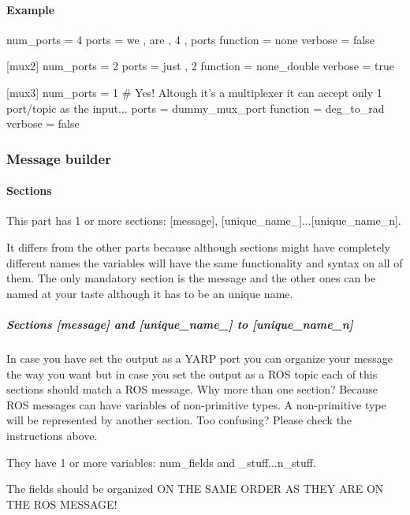 \paragraph*{Example}

\begin{DoxyVerb}[mux1]
num_ports = 4
ports = we , are , 4 , ports
function = none
verbose = false

[mux2]
num_ports = 2
ports = just , 2
function = none_double
verbose = true

[mux3]
num_ports = 1
# Yes! Altough it's a multiplexer it can accept only 1 port/topic as the input...
ports = dummy_mux_port
function = deg_to_rad
verbose = false
\end{DoxyVerb}


\subsubsection*{Message builder}

\paragraph*{Sections}

This part has 1 or more sections\-: {\ttfamily \mbox{[}message\mbox{]}}, {\ttfamily \mbox{[}unique\-\_\-name\-\_\mbox{]}...\mbox{[}unique\-\_\-name\-\_\-n\mbox{]}}.

It differs from the other parts because although sections might have completely different names the variables will have the same functionality and syntax on all of them. The only mandatory section is the {\ttfamily message} and the other ones can be named at your taste although it has to be an unique name.

\subparagraph*{Sections \mbox{[}message\mbox{]} and \mbox{[}unique\-\_\-name\-\_\mbox{]} to \mbox{[}unique\-\_\-name\-\_\-n\mbox{]}}

In case you have set the output as a Y\-A\-R\-P port you can organize your message the way you want but in case you set the output as a R\-O\-S topic each of this sections should match a R\-O\-S message. Why more than one section? Because R\-O\-S messages can have variables of non-\/primitive types. A non-\/primitive type will be represented by another section. Too confusing? Please check the instructions above.

They have 1 or more variables\-: {\ttfamily num\-\_\-fields} and {\-\_\-stuff...n\-\_\-stuff}.

The fields should be organized O\-N T\-H\-E S\-A\-M\-E O\-R\-D\-E\-R A\-S T\-H\-E\-Y A\-R\-E O\-N T\-H\-E R\-O\-S M\-E\-S\-S\-A\-G\-E!


